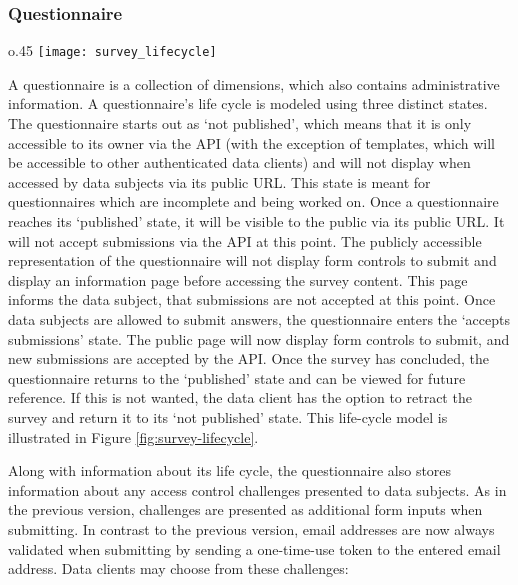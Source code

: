     \subsubsection{Questionnaire}
        \begin{wrapfigure}{o}{.45\textwidth}
            \centering
            \texttt{[image: survey\_lifecycle]}
            \caption{Questionnaire life-cycle}
            \label{fig:survey-lifecycle}
        \end{wrapfigure}
        A questionnaire is a collection of dimensions, which also contains administrative
        information. A questionnaire's life cycle is modeled using three
        distinct states. The questionnaire starts out as `not published',
        which means that it is only accessible to its owner via the API
        (with the exception of templates, which will be accessible to other
        authenticated data clients)
        and will not display when accessed by data subjects via its
        public URL. This state is meant for questionnaires which are
        incomplete and being worked on. Once a questionnaire reaches its
        `published' state, it will be visible to the public via its
        public URL. It will not accept submissions via the API at this point.
        The publicly accessible representation of the questionnaire will
        not display form controls to submit and display an information
        page before accessing the survey content. This page informs the data subject,
        that submissions are not accepted at this point. Once data subjects
        are allowed to submit answers, the questionnaire enters
        the `accepts submissions' state. The public page will now display
        form controls to submit, and new submissions are accepted by the API.
        Once the survey has concluded, the questionnaire returns to
        the `published' state and can be viewed for future reference.
        If this is not wanted, the data client has the option to retract
        the survey and return it to its `not published' state.
        This life-cycle model is illustrated in Figure \ref{fig:survey-lifecycle}.

        Along with information about its life cycle, the questionnaire
        also stores information about any access control challenges
        presented to data subjects. As in the previous version, challenges
        are presented as additional form inputs when submitting. 
        In contrast to the previous version, email addresses are now always
        validated when submitting by sending a one-time-use token to the
        entered email address.
        Data clients may choose from these challenges:
        
